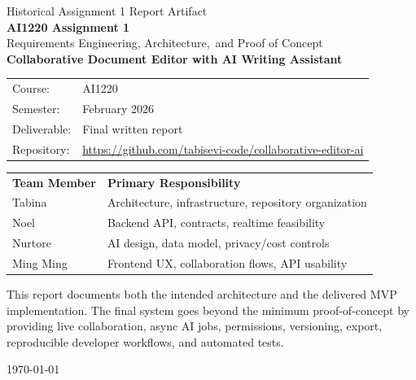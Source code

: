 \begin{titlepage}
  \centering
  \vspace*{2cm}

  {\large Historical Assignment 1 Report Artifact}\\[0.6cm]

  {\Huge \textbf{AI1220 Assignment 1}}\\[0.5cm]
  {\LARGE Requirements Engineering, Architecture,\
  and Proof of Concept}\\[1.2cm]

  {\Large \textbf{Collaborative Document Editor with AI Writing Assistant}}\\[1.2cm]

  \begin{tabular}{ll}
    Course: & AI1220 \\
    Semester: & February 2026 \\
    Deliverable: & Final written report \\
    Repository: & \url{https://github.com/tabisevi-code/collaborative-editor-ai}
  \end{tabular}

  \vfill

  \begin{tabular}{ll}
    \textbf{Team Member} & \textbf{Primary Responsibility} \\
    Tabina & Architecture, infrastructure, repository organization \\
    Noel & Backend API, contracts, realtime feasibility \\
    Nurtore & AI design, data model, privacy/cost controls \\
    Ming Ming & Frontend UX, collaboration flows, API usability
  \end{tabular}

  \vfill

  \begin{minipage}{0.9\textwidth}
    \small
    This report documents both the intended architecture and the delivered MVP implementation. The
    final system goes beyond the minimum proof-of-concept by providing live collaboration, async AI
    jobs, permissions, versioning, export, reproducible developer workflows, and automated tests.
  \end{minipage}

  \vfill
  {\large \today}
\end{titlepage}

\clearpage
